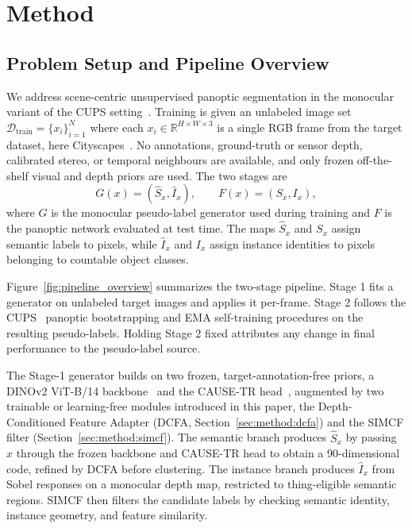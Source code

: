\documentclass{article}
\begin{document}
\section{Method}
\label{sec:method}

\subsection{Problem Setup and Pipeline Overview}
\label{sec:method:setup}

We address scene-centric unsupervised panoptic segmentation in the monocular variant of the CUPS setting~\cite{hahn2025cups}. Training is given an unlabeled image set $\mathcal{D}_{\text{train}} = \{x_i\}_{i=1}^{N}$ where each $x_i \in \mathbb{R}^{H \times W \times 3}$ is a single RGB frame from the target dataset, here Cityscapes~\cite{cordts2016cityscapes}. No annotations, ground-truth or sensor depth, calibrated stereo, or temporal neighbours are available, and only frozen off-the-shelf visual and depth priors are used. The two stages are
\begin{equation}
G(x) = (\hat S_x, \hat I_x), \qquad F(x) = (S_x, I_x),
\label{eq:pipeline}
\end{equation}
where $G$ is the monocular pseudo-label generator used during training and $F$ is the panoptic network evaluated at test time. The maps $\hat S_x$ and $S_x$ assign semantic labels to pixels, while $\hat I_x$ and $I_x$ assign instance identities to pixels belonging to countable object classes.

Figure~\ref{fig:pipeline_overview} summarizes the two-stage pipeline. Stage 1 fits a generator on unlabeled target images and applies it per-frame. Stage 2 follows the CUPS~\cite{hahn2025cups} panoptic bootstrapping and EMA self-training procedures on the resulting pseudo-labels. Holding Stage 2 fixed attributes any change in final performance to the pseudo-label source.

The Stage-1 generator builds on two frozen, target-annotation-free priors, a DINOv2 ViT-B/14 backbone~\cite{oquab2024dinov2} and the CAUSE-TR head~\cite{kim2024cause}, augmented by two trainable or learning-free modules introduced in this paper, the Depth-Conditioned Feature Adapter (DCFA, Section~\ref{sec:method:dcfa}) and the SIMCF filter (Section~\ref{sec:method:simcf}). The semantic branch produces $\hat S_x$ by passing $x$ through the frozen backbone and CAUSE-TR head to obtain a 90-dimensional code, refined by DCFA before clustering. The instance branch produces $\hat I_x$ from Sobel responses on a monocular depth map, restricted to thing-eligible semantic regions. SIMCF then filters the candidate labels by checking semantic identity, instance geometry, and feature similarity.
\end{document}
